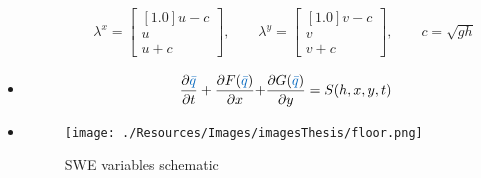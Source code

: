 \begin{frame}
\begin{minipage}{0.35\textwidth}
\begin{itemize}
\begin{align*}
&\qquad \lambda^x = 
\begin{bmatrix}[1.0]
u - c\\
u\\
u+c
\end{bmatrix}
,\qquad  \lambda^y = 
\begin{bmatrix}[1.0]
v - c\\
v\\
v+c
\end{bmatrix}
,\qquad c = \sqrt{gh}
\end{align*}
\item<2->[]
\begin{align*}
\qquad \qquad \frac{\partial \myTUMdarkblue{\bar{q}}}{\partial t} + \dfrac{\partial F(\myTUMdarkblue{\bar{q}})}{\partial x} + &\frac{\partial G(\myTUMdarkblue{\bar{q}})}{\partial y} = S(h,x,y,t)
\end{align*}
\end{itemize}
\end{minipage}
\begin{minipage}{0.45\textwidth}  
\begin{itemize}[leftmargin=*]
\item<1->[]
\vspace{2cm}
\begin{center}
\begin{figure}
\texttt{[image: ./Resources/Images/imagesThesis/floor.png]}%
\caption{SWE variables schematic}
\label{fig:swechemedit}
\end{figure}
\end{center}
\end{itemize}
\end{minipage}

\end{frame}
\clearpage


